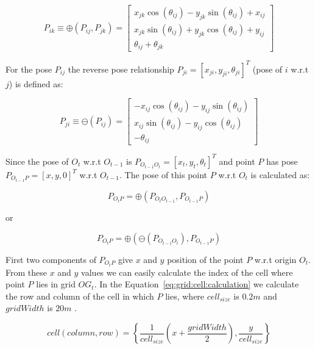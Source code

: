 \begin{equation}
P_{ik} \equiv \oplus (P_{ij}, P_{jk}) = \left[ \begin{array}{c}
x_{jk}\cos(\theta_{ij})-y_{jk}\sin(\theta_{ij})+x_{ij} \\
x_{jk}\sin(\theta_{ij})+y_{jk}\cos(\theta_{ij})+y_{ij} \\
\theta_{ij}+\theta_{jk} \end{array} \right] 
\label{eq:composepose}
\end{equation}

For the pose $P_{ij}$ the reverse pose relationship $P_{ji}=[x_{ji}, y_{ji}, \theta_{ji}]^T$ (pose of $i$ w.r.t $j$) is defined as:

\begin{equation}
P_{ji} \equiv \ominus (P_{ij}) = \left[ \begin{array}{c}
-x_{ij}\cos(\theta_{ij})-y_{ij}\sin(\theta_{ij}) \\
x_{ij}\sin(\theta_{ij})-y_{ij}\cos(\theta_{ij}) \\
-\theta_{ij} \end{array} \right] 
\label{eq:invpose}
\end{equation}

Since the pose of $O_t$ w.r.t $O_{t-1}$ is $P_{O_{t-1}O_t}=[x_t,y_t,\theta_t]^T$ and point $P$ has pose $P_{O_{t-1}P}=[x,y,0]^T$ w.r.t $O_{t-1}$. The pose of this point $P$ w.r.t $O_t$ is calculated as:

\begin{equation}
P_{O_tP} = \oplus (P_{O_tO_{t-1}}, P_{O_{t-1}P})
\label{eq:pose:compound}
\end{equation}

or

\begin{equation}
P_{O_tP} = \oplus (\ominus(P_{O_{t-1}O_t}), P_{O_{t-1}P})
\label{eq:pose:compound:inverse}
\end{equation}

First two components of $P_{O_tP}$ give $x$ and $y$ position of the point $P$ w.r.t origin $O_t$. From these $x$ and $y$ values we can easily calculate the index of the cell where point $P$ lies in grid $OG_t$. In the Equation~\ref{eq:grid:cell:calculation} we calculate the row and column of the cell in which $P$ lies, where $cell_{size}$ is $0.2m$ and $gridWidth$ is $20m$ .

\begin{equation}
cell(column,row)=\left\{\frac{1}{cell_{size}}(x+\frac{gridWidth}{2}),\frac{y}{cell_{size}} \right\}
\label{eq:grid:cell:calculation}
\end{equation}


